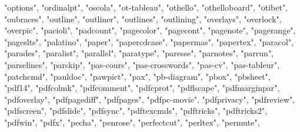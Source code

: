 \documentclass[
]{article}
\newenvironment{Shaded}{\begin{snugshade}}{\end{snugshade}}
\newcommand{\NormalTok}[1]{#1}
\newcommand{\StringTok}[1]{\textcolor[rgb]{0.31,0.60,0.02}{#1}}
\begin{document}
\begin{Shaded}
\begin{Highlighting}[]
\StringTok{"options"}\NormalTok{, }\StringTok{"ordinalpt"}\NormalTok{, }\StringTok{"oscola"}\NormalTok{, }\StringTok{"ot{-}tableau"}\NormalTok{, }\StringTok{"othello"}\NormalTok{, }\StringTok{"othelloboard"}\NormalTok{, }
\StringTok{"otibet"}\NormalTok{, }\StringTok{"oubraces"}\NormalTok{, }\StringTok{"outline"}\NormalTok{, }\StringTok{"outliner"}\NormalTok{, }\StringTok{"outlines"}\NormalTok{, }\StringTok{"outlining"}\NormalTok{, }
\StringTok{"overlays"}\NormalTok{, }\StringTok{"overlock"}\NormalTok{, }\StringTok{"overpic"}\NormalTok{, }\StringTok{"pacioli"}\NormalTok{, }\StringTok{"padcount"}\NormalTok{, }\StringTok{"pagecolor"}\NormalTok{, }
\StringTok{"pagecont"}\NormalTok{, }\StringTok{"pagenote"}\NormalTok{, }\StringTok{"pagerange"}\NormalTok{, }\StringTok{"pageslts"}\NormalTok{, }\StringTok{"palatino"}\NormalTok{, }
\StringTok{"paper"}\NormalTok{, }\StringTok{"papercdcase"}\NormalTok{, }\StringTok{"papermas"}\NormalTok{, }\StringTok{"papertex"}\NormalTok{, }\StringTok{"paracol"}\NormalTok{, }\StringTok{"parades"}\NormalTok{, }
\StringTok{"paralist"}\NormalTok{, }\StringTok{"parallel"}\NormalTok{, }\StringTok{"paratype"}\NormalTok{, }\StringTok{"paresse"}\NormalTok{, }\StringTok{"parnotes"}\NormalTok{, }\StringTok{"parrun"}\NormalTok{, }
\StringTok{"parselines"}\NormalTok{, }\StringTok{"parskip"}\NormalTok{, }\StringTok{"pas{-}cours"}\NormalTok{, }\StringTok{"pas{-}crosswords"}\NormalTok{, }\StringTok{"pas{-}cv"}\NormalTok{, }
\StringTok{"pas{-}tableur"}\NormalTok{, }\StringTok{"patchcmd"}\NormalTok{, }\StringTok{"pauldoc"}\NormalTok{, }\StringTok{"pawpict"}\NormalTok{, }\StringTok{"pax"}\NormalTok{, }\StringTok{"pb{-}diagram"}\NormalTok{, }
\StringTok{"pbox"}\NormalTok{, }\StringTok{"pbsheet"}\NormalTok{, }\StringTok{"pdf14"}\NormalTok{, }\StringTok{"pdfcolmk"}\NormalTok{, }\StringTok{"pdfcomment"}\NormalTok{, }\StringTok{"pdfcprot"}\NormalTok{, }
\StringTok{"pdflscape"}\NormalTok{, }\StringTok{"pdfmarginpar"}\NormalTok{, }\StringTok{"pdfoverlay"}\NormalTok{, }\StringTok{"pdfpagediff"}\NormalTok{, }\StringTok{"pdfpages"}\NormalTok{, }
\StringTok{"pdfpc{-}movie"}\NormalTok{, }\StringTok{"pdfprivacy"}\NormalTok{, }\StringTok{"pdfreview"}\NormalTok{, }\StringTok{"pdfscreen"}\NormalTok{, }\StringTok{"pdfslide"}\NormalTok{, }
\StringTok{"pdfsync"}\NormalTok{, }\StringTok{"pdftexcmds"}\NormalTok{, }\StringTok{"pdftricks"}\NormalTok{, }\StringTok{"pdftricks2"}\NormalTok{, }\StringTok{"pdfwin"}\NormalTok{, }
\StringTok{"pdfx"}\NormalTok{, }\StringTok{"pecha"}\NormalTok{, }\StringTok{"penrose"}\NormalTok{, }\StringTok{"perfectcut"}\NormalTok{, }\StringTok{"perltex"}\NormalTok{, }\StringTok{"permute"}\NormalTok{, }

\end{Highlighting}
\end{Shaded}
\end{document}
